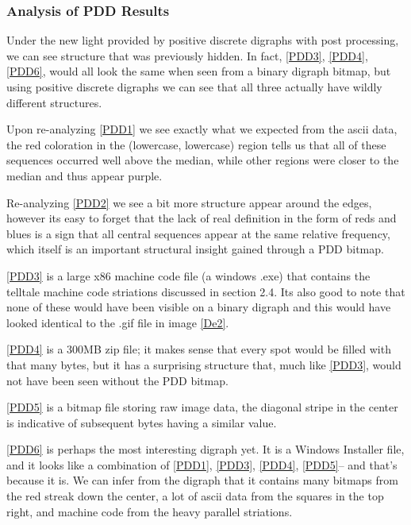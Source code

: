 \documentclass[12pt,a4paper]{article}
\begin{document}
\subsubsection{Analysis of PDD Results}
Under the new light provided by positive discrete digraphs with post processing, we can see structure 
that was previously hidden. In fact, \ref{PDD3}, \ref{PDD4}, \ref{PDD6}, would all look the same when seen from a binary digraph bitmap, but using positive discrete digraphs we can see that all three actually have wildly different structures. 

Upon re-analyzing \ref{PDD1} we see exactly what we expected from the ascii data, the red coloration in the (lowercase, lowercase) region tells us that all of these sequences occurred well above the median, while other regions were closer to the median and thus appear purple.

Re-analyzing \ref{PDD2} we see a bit more structure appear around the edges, however its easy to forget that the lack of real definition in the form of reds and blues is a sign that all central sequences appear at the same relative frequency, which itself is an important structural insight gained through  a PDD bitmap.

\ref{PDD3} is a large x86 machine code file (a windows .exe) that contains the telltale machine code striations discussed in section 2.4. Its also good to note that none of these would have been visible on a binary digraph and this would have looked identical to the .gif file in image \ref{De2}.

\ref{PDD4} is a 300MB zip file; it makes sense that every spot would be filled with that many bytes, but it has a surprising structure that, much like \ref{PDD3}, would not have been seen without the PDD bitmap.

\ref{PDD5} is a bitmap file storing raw image data, the diagonal stripe in the center is indicative of subsequent bytes having a similar value.

\ref{PDD6} is perhaps the most interesting digraph yet. It is a Windows Installer file, and it looks like a combination of \ref{PDD1}, \ref{PDD3}, \ref{PDD4}, \ref{PDD5}-- and that's because it is. We can infer from the digraph that it contains many bitmaps from the red streak down the center, a lot of ascii data from the squares in the top right, and machine code from the heavy parallel striations. 
\end{document}
